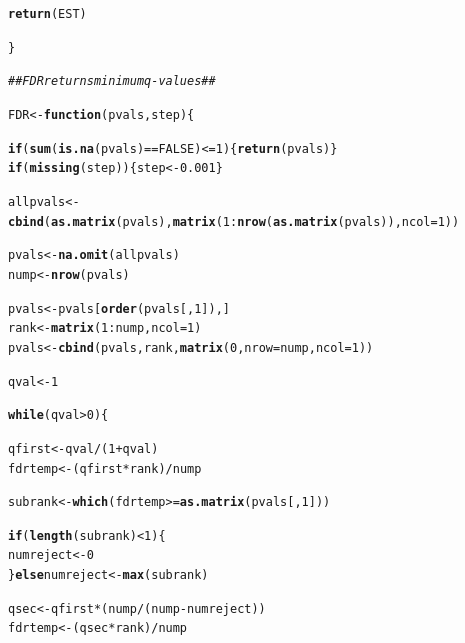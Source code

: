 \documentclass[11pt, a4paper]{article}\usepackage[]{graphicx}\usepackage[]{color}
\makeatletter
\newcommand{\hlnum}[1]{\textcolor[rgb]{0.686,0.059,0.569}{#1}}%
\newcommand{\hlcom}[1]{\textcolor[rgb]{0.678,0.584,0.686}{\textit{#1}}}%
\newcommand{\hlopt}[1]{\textcolor[rgb]{0,0,0}{#1}}%
\newcommand{\hlstd}[1]{\textcolor[rgb]{0.345,0.345,0.345}{#1}}%
\newcommand{\hlkwa}[1]{\textcolor[rgb]{0.161,0.373,0.58}{\textbf{#1}}}%
\newcommand{\hlkwb}[1]{\textcolor[rgb]{0.69,0.353,0.396}{#1}}%
\newcommand{\hlkwc}[1]{\textcolor[rgb]{0.333,0.667,0.333}{#1}}%
\newcommand{\hlkwd}[1]{\textcolor[rgb]{0.737,0.353,0.396}{\textbf{#1}}}%
\newenvironment{kframe}{%
 \def\at@end@of@kframe{}%
 \ifinner\ifhmode%
  \def\at@end@of@kframe{\end{minipage}}%
  \begin{minipage}{\columnwidth}%
 \fi\fi%
 \def\FrameCommand##1{\hskip\@totalleftmargin \hskip-\fboxsep
 \colorbox{shadecolor}{##1}\hskip-\fboxsep
     \hskip-\linewidth \hskip-\@totalleftmargin \hskip\columnwidth}%
 \MakeFramed {\advance\hsize-\width
   \@totalleftmargin\z@ \linewidth\hsize
   \@setminipage}}%
 {\par\unskip\endMakeFramed%
 \at@end@of@kframe}
\newenvironment{knitrout}{}{} %
\makeatother
\begin{document}
\begin{knitrout}
\begin{kframe}
\begin{alltt}
        \hlkwd{return}\hlstd{(EST)}

    \hlstd{\}}

    \hlcom{## FDR returns minimum q-values ##}

    \hlstd{FDR} \hlkwb{<-} \hlkwa{function}\hlstd{(}\hlkwc{pvals}\hlstd{,} \hlkwc{step}\hlstd{) \{}

        \hlkwa{if} \hlstd{(}\hlkwd{sum}\hlstd{(}\hlkwd{is.na}\hlstd{(pvals)} \hlopt{==} \hlnum{FALSE}\hlstd{)} \hlopt{<=} \hlnum{1}\hlstd{) \{}\hlkwd{return}\hlstd{(pvals)\}}
        \hlkwa{if} \hlstd{(}\hlkwd{missing}\hlstd{(step)) \{step} \hlkwb{<-} \hlnum{0.001}\hlstd{\}}

        \hlstd{allpvals} \hlkwb{<-} \hlkwd{cbind}\hlstd{(}\hlkwd{as.matrix}\hlstd{(pvals),} \hlkwd{matrix}\hlstd{(}\hlnum{1}\hlopt{:}\hlkwd{nrow}\hlstd{(}\hlkwd{as.matrix}\hlstd{(pvals)),} \hlkwc{ncol} \hlstd{=} \hlnum{1}\hlstd{))}

        \hlstd{pvals} \hlkwb{<-} \hlkwd{na.omit}\hlstd{(allpvals)}
        \hlstd{nump} \hlkwb{<-} \hlkwd{nrow}\hlstd{(pvals)}

        \hlstd{pvals} \hlkwb{<-} \hlstd{pvals[}\hlkwd{order}\hlstd{(pvals[,} \hlnum{1}\hlstd{]), ]}
        \hlstd{rank} \hlkwb{<-} \hlkwd{matrix}\hlstd{(}\hlnum{1}\hlopt{:}\hlstd{nump,} \hlkwc{ncol} \hlstd{=} \hlnum{1}\hlstd{)}
        \hlstd{pvals} \hlkwb{<-} \hlkwd{cbind}\hlstd{(pvals, rank,} \hlkwd{matrix}\hlstd{(}\hlnum{0}\hlstd{,} \hlkwc{nrow} \hlstd{= nump,} \hlkwc{ncol} \hlstd{=} \hlnum{1}\hlstd{))}

        \hlstd{qval} \hlkwb{<-} \hlnum{1}

        \hlkwa{while} \hlstd{(qval} \hlopt{>} \hlnum{0}\hlstd{) \{}

            \hlstd{qfirst} \hlkwb{<-} \hlstd{qval} \hlopt{/} \hlstd{(}\hlnum{1} \hlopt{+} \hlstd{qval)}
            \hlstd{fdrtemp} \hlkwb{<-} \hlstd{(qfirst} \hlopt{*} \hlstd{rank)} \hlopt{/} \hlstd{nump}

            \hlstd{subrank} \hlkwb{<-} \hlkwd{which}\hlstd{(fdrtemp} \hlopt{>=} \hlkwd{as.matrix}\hlstd{(pvals[,} \hlnum{1}\hlstd{]))}

            \hlkwa{if} \hlstd{(}\hlkwd{length}\hlstd{(subrank)} \hlopt{<} \hlnum{1}\hlstd{) \{}
                \hlstd{numreject} \hlkwb{<-} \hlnum{0}
            \hlstd{\}} \hlkwa{else} \hlstd{numreject} \hlkwb{<-} \hlkwd{max}\hlstd{(subrank)}

            \hlstd{qsec} \hlkwb{<-} \hlstd{qfirst} \hlopt{*} \hlstd{(nump} \hlopt{/} \hlstd{(nump} \hlopt{-} \hlstd{numreject))}
            \hlstd{fdrtemp} \hlkwb{<-} \hlstd{(qsec} \hlopt{*} \hlstd{rank)} \hlopt{/} \hlstd{nump}


\end{alltt}
\end{kframe}
\end{knitrout}
\end{document}
